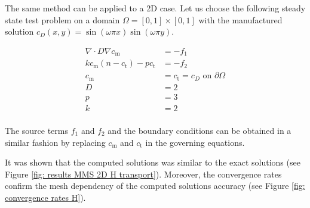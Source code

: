 The same method can be applied to a 2D case.
Let us choose the following steady state test problem on a domain $\Omega = [0, 1] \times [0, 1]$ with the manufactured solution $c_D(x, y) = \sin(\omega \pi x) \sin(\omega \pi y)$.

\begin{align}
    \nabla \cdot D \nabla c_\mathrm{m} &= -f_1 \\
    k c_\mathrm{m} (n - c_\mathrm{t}) - p c_\mathrm{t} &= -f_2 \\
    c_\mathrm{m} &= c_\mathrm{t} = c_D \text{  on  } \partial \Omega \\
    D &= 2 \\
    p &= 3 \\
    k &= 2 \\
\end{align}

The source terms $f_1$ and $f_2$ and the boundary conditions can be obtained in a similar fashion by replacing $c_\mathrm{m}$ and $c_\mathrm{t}$ in the governing equations.

It was shown that the computed solutions was similar to the exact solutions (see Figure \ref{fig: results MMS 2D H transport}).
Moreover, the convergence rates confirm the mesh dependency of the computed solutions accuracy (see Figure \ref{fig: convergence rates H}).

